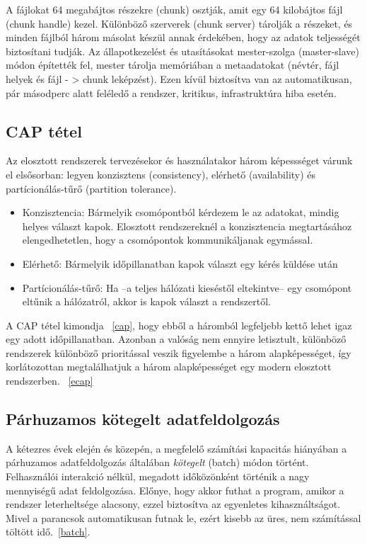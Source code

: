 \documentclass[a4paper,12pt]{article}
\begin{document}
A fájlokat 64 megabájtos részekre (chunk) osztják, amit egy 64 kilobájtos fájl (chunk handle) kezel. Különböző szerverek (chunk server) tárolják a részeket, és minden fájlból három másolat készül annak érdekében, hogy az adatok teljességét biztosítani tudják. Az állapotkezelést és utasításokat mester-szolga (master-slave) módon építették fel, mester tárolja memóriában a metaadatokat (névtér, fájl helyek és fájl - > chunk leképzést). Ezen kívül biztosítva van az automatikusan, pár másodperc alatt feléledő a rendszer, kritikus, infrastruktúra hiba esetén.

\subsection{CAP tétel}
Az elosztott rendszerek tervezésekor és használatakor három képessséget várunk el elsősorban: legyen konzisztens (consistency), elérhető (availability) és partícionálás-tűrő (partition tolerance). 
\begin{itemize}
\item Konzisztencia: Bármelyik csomópontból kérdezem le az adatokat, mindig helyes választ kapok. Elosztott rendszereknél a konzisztencia megtartásához elengedhetetlen, hogy a csomópontok kommunikáljanak egymással. 
\item Elérhető: Bármelyik időpillanatban kapok választ egy kérés küldése után
\item Partícionálás-tűrő: Ha --a teljes hálózati kieséstől eltekintve-- egy csomópont eltűnik a hálózatról, akkor is kapok választ a rendszertől.
\end{itemize}
A CAP tétel kimondja ~\ref{cap}, hogy ebből a háromból legfeljebb kettő lehet igaz egy adott időpillanatban. Azonban a valóság nem ennyire letisztult, különböző rendszerek különböző prioritással veszik figyelembe a három alapképességet, így korlátozottan megtalálhatjuk a három alapképességet egy modern elosztott rendszerben. ~\ref{ecap}

\subsection{Párhuzamos kötegelt adatfeldolgozás}
A kétezres évek elején és közepén, a megfelelő számítási kapacitás hiányában a párhuzamos adatfeldolgozás általában \textsl{kötegelt} (batch) módon történt. Felhasználói interakció nélkül, megadott időközönként történik a nagy mennyiségű adat feldolgozása. Előnye, hogy akkor futhat a program, amikor a rendszer leterheltsége alacsony, ezzel biztosítva az egyenletes kihasználtságot. Mivel a parancsok automatikusan futnak le, ezért kisebb az üres, nem számítással töltött idő.~\ref{batch}.
\end{document}
